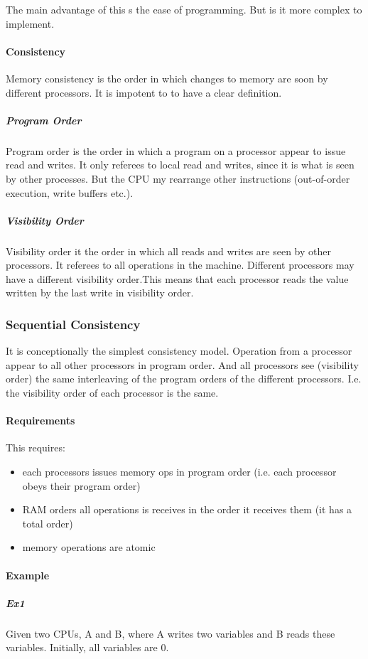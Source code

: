 The main advantage of this s the ease of programming. But is it more complex to implement.

\paragraph{Consistency}
Memory consistency is the order in which changes to memory are soon by different processors. It is impotent to to have a clear definition.

\subparagraph{Program Order}
Program order is the order in which a program on a processor appear to issue read and writes. It only referees to local read and writes, since it is what is seen by other processes. But the CPU my rearrange other instructions (out-of-order execution, write buffers etc.).

\subparagraph{Visibility Order}
Visibility order it the order in which all reads and writes are seen by other processors. It referees to all operations in the machine. Different processors may have a different visibility order.This means that each processor reads the value written by the last write in visibility order.

\subsubsection{Sequential Consistency}
It is conceptionally the simplest consistency model. Operation from a processor appear to all other processors in program order. And all processors see (visibility order) the same interleaving of the program orders of the different processors. I.e. the visibility order of each processor is the same.

\paragraph{Requirements}
This requires:
\begin{itemize}
    \item each processors issues memory ops in program order (i.e. each processor obeys their program order)
    \item RAM orders all operations is receives in the order it receives them (it has a total order)
    \item memory operations are atomic
\end{itemize}

\paragraph{Example}
\subparagraph{Ex1}
Given two CPUs, A and B, where A writes two variables and B reads these variables. Initially, all variables are $0$.

